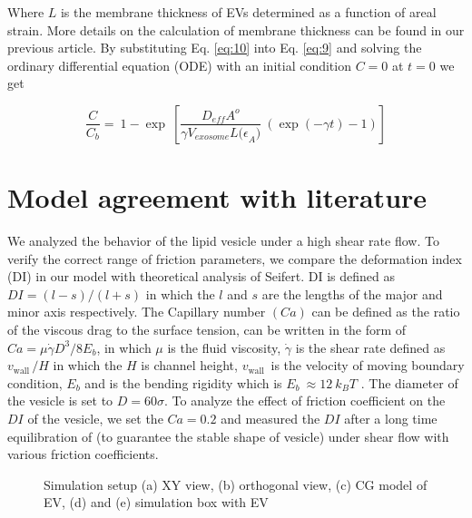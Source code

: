 Where $L$ is the membrane thickness of EVs determined as a function of areal strain. More details on the calculation of membrane thickness can be found in our previous article\cite{a66}. By substituting Eq. \ref{eq:10} into Eq. \ref{eq:9} and solving the ordinary differential equation (ODE) with an initial condition $C=0$ at $t=0$ we get

\vspace{0.5cm}
\begin{equation}\label{eq:10}
\frac{C}{C_b}=\ 1-\exp \ [\frac{D_{eff}A^o}{\gamma V_{exosome}L{(\epsilon}_A)}\ \left(\exp{\left(-\gamma t\right)}-1\right)] 
\end{equation}
\vspace{0.5cm}

\section{Model agreement with literature}

We analyzed the behavior of the lipid vesicle under a high shear rate flow. To verify the correct range of friction parameters, we compare the deformation index (DI) in our model with theoretical analysis of Seifert\cite{a62}. DI is defined as $DI=(l-s)/(l+s)$ in which the $l$ and $s$ are the lengths of the major and minor axis respectively. The Capillary number $(Ca)$ can be defined as the ratio of the viscous drag to the surface tension, can be written in the form of $Ca=\mu\dot{\gamma}D^3/8E_b$, in which $\mu$ is the fluid viscosity,  $\dot{\gamma}$ is the shear rate defined as $v_{\mathrm{wall\ }}/H$ in which the $H$ is channel height, $v_{\mathrm{wall\ }}$ is the velocity of moving boundary condition, $E_b$ and  is the bending rigidity which is $E_b\ \approx12\ k_BT$ \cite{a33, a38}. The diameter of the vesicle is set to $D=60\sigma$. To analyze the effect of friction coefficient on the $DI$ of the vesicle, we set the $Ca=0.2$ and measured the $DI$ after a long time equilibration of (to guarantee the stable shape of vesicle) under shear flow with various friction coefficients. 

\begin{figure}[htbp]
  \centering
  
  \vspace{0.5cm}
  \caption{ Simulation setup (a) XY view, (b) orthogonal view, (c) CG model of EV, (d) and (e) simulation box with EV}
  \vspace{0.5cm}
  \label{fig:3}
\end{figure}

